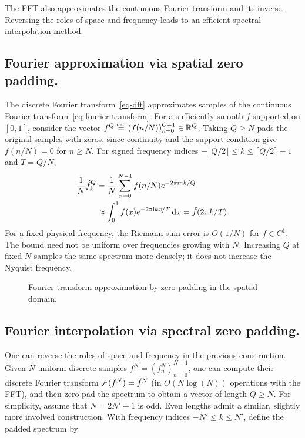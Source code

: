 The FFT also approximates the continuous Fourier transform and its inverse. Reversing the roles of space and frequency leads to an efficient spectral interpolation method.


\subsection{Fourier approximation via spatial zero padding.}

The discrete Fourier transform~\eqref{eq-dft} approximates samples of the continuous Fourier transform~\eqref{eq-fourier-transform}. For a sufficiently smooth $f$ supported on $[0,1]$, consider the vector $f^Q \stackrel{\mbox{\upshape\tiny def.}}{=} (f(n/N))_{n=0}^{Q-1} \in \mathbb{R}^Q$. Taking $Q\geq N$ pads the original samples with zeros, since continuity and the support condition give $f(n/N)=0$ for $n\geq N$.
For signed frequency indices $-\lfloor Q/2\rfloor\leq k\leq\lceil Q/2\rceil-1$ and $T=Q/N$,
\begin{align*}
 \frac1N\hat f_k^Q
 &=\frac1N\sum_{n=0}^{N-1}f(n/N)e^{-2\pi\mathrm{i} nk/Q}\\
 &\approx\int_0^1f(x)e^{-2\pi\mathrm{i} kx/T}\,\mathrm{d} x
 =\hat f(2\pi k/T).
\end{align*}
For a fixed physical frequency, the Riemann-sum error is $O(1/N)$ for $f\in C^1$. The bound need not be uniform over frequencies growing with $N$. Increasing $Q$ at fixed $N$ samples the same spectrum more densely; it does not increase the Nyquist frequency.

\begin{figure}[tbp]
\centering
{}
\caption{Fourier transform approximation by zero-padding in the spatial domain.}
\label{fig-padding-spacial}
\end{figure}


\subsection{Fourier interpolation via spectral zero padding.}

One can reverse the roles of space and frequency in the previous construction. 
%
Given $N$ uniform discrete samples $f^N=(f^N_n)_{n=0}^{N-1}$, one can compute their discrete Fourier transform $\mathcal{F}(f^N) = \hat f^N$ (in $O(N \log(N))$ operations with the FFT),
and then zero-pad the spectrum to obtain a vector of length $Q\geq N$.
%
For simplicity, assume that $N=2N'+1$ is odd. Even lengths admit a similar, slightly more involved construction.
%
With frequency indices $-N'\leq k\leq N'$, define the padded spectrum by

